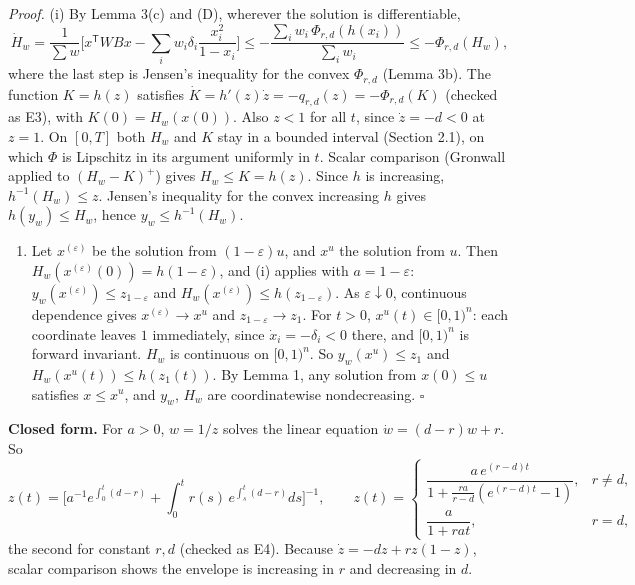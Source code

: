 \documentclass[
  11pt,
  a4paper,
]{article}
\providecommand{\tightlist}{%
  \setlength{\itemsep}{0pt}\setlength{\parskip}{0pt}}
\begin{document}
\emph{Proof.} (i) By Lemma 3(c) and (D), wherever the solution is
differentiable,
\[\dot H_w=\frac{1}{\sum w}\Big[x^{\mathsf T}WBx-\sum_iw_i\delta_i\frac{x_i^2}{1-x_i}\Big]\le-\frac{\sum_iw_i\,\Phi_{r,d}(h(x_i))}{\sum_iw_i}\le-\Phi_{r,d}(H_w),\]
where the last step is Jensen's inequality for the convex \(\Phi_{r,d}\)
(Lemma 3b). The function \(K=h(z)\) satisfies
\(\dot K=h'(z)\dot z=-q_{r,d}(z)=-\Phi_{r,d}(K)\) (checked as E3), with
\(K(0)=H_w(x(0))\). Also \(z<1\) for all \(t\), since \(\dot z=-d<0\) at
\(z=1\). On \([0,T]\) both \(H_w\) and \(K\) stay in a bounded interval
(Section 2.1), on which \(\Phi\) is Lipschitz in its argument uniformly
in \(t\). Scalar comparison (Gronwall applied to \((H_w-K)^+\)) gives
\(H_w\le K=h(z)\). Since \(h\) is increasing, \(h^{-1}(H_w)\le z\).
Jensen's inequality for the convex increasing \(h\) gives
\(h(y_w)\le H_w\), hence \(y_w\le h^{-1}(H_w)\).

\begin{enumerate}
\def\labelenumi{(\roman{enumi})}
\setcounter{enumi}{1}
\tightlist
\item
  Let \(x^{(\varepsilon)}\) be the solution from \((1-\varepsilon)u\),
  and \(x^{u}\) the solution from \(u\). Then
  \(H_w(x^{(\varepsilon)}(0))=h(1-\varepsilon)\), and (i) applies with
  \(a=1-\varepsilon\): \(y_w(x^{(\varepsilon)})\le z_{1-\varepsilon}\)
  and \(H_w(x^{(\varepsilon)})\le h(z_{1-\varepsilon})\). As
  \(\varepsilon\downarrow0\), continuous dependence gives
  \(x^{(\varepsilon)}\to x^{u}\) and \(z_{1-\varepsilon}\to z_1\). For
  \(t>0\), \(x^{u}(t)\in[0,1)^n\): each coordinate leaves \(1\)
  immediately, since \(\dot x_i=-\delta_i<0\) there, and \([0,1)^n\) is
  forward invariant. \(H_w\) is continuous on \([0,1)^n\). So
  \(y_w(x^u)\le z_1\) and \(H_w(x^u(t))\le h(z_1(t))\). By Lemma 1, any
  solution from \(x(0)\le u\) satisfies \(x\le x^{u}\), and \(y_w\),
  \(H_w\) are coordinatewise nondecreasing. \(\square\)
\end{enumerate}

\textbf{Closed form.} For \(a>0\), \(w=1/z\) solves the linear equation
\(\dot w=(d-r)w+r\). So \[
z(t)=\Big[a^{-1}e^{\int_0^t(d-r)}+\int_0^tr(s)\,e^{\int_s^t(d-r)}ds\Big]^{-1},\qquad
z(t)=\begin{cases}\dfrac{a\,e^{(r-d)t}}{1+\frac{ra}{r-d}(e^{(r-d)t}-1)},&r\neq d,\\[1.2ex]\dfrac{a}{1+rat},&r=d,\end{cases} \tag{3.3}
\] the second for constant \(r,d\) (checked as E4). Because
\(\dot z=-dz+rz(1-z)\), scalar comparison shows the envelope is
increasing in \(r\) and decreasing in \(d\).
\end{document}
